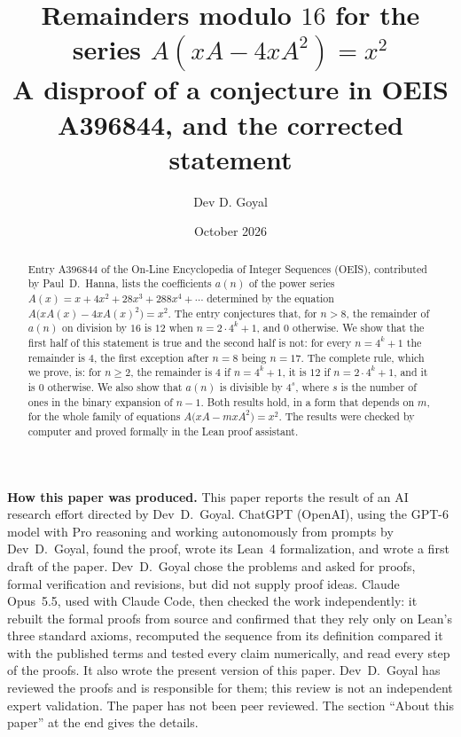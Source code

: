 \documentclass[11pt,a4paper]{article}
\title{Remainders modulo $16$ for the series $A(xA-4xA^2)=x^2$\\[6pt]\large A disproof of a conjecture in OEIS A396844, and the corrected statement}
\author{Dev D. Goyal}
\date{October 2026}
\theoremstyle{definition}
\theoremstyle{remark}
\begin{document}
\maketitle
\begin{abstract}
Entry A396844 of the On-Line Encyclopedia of Integer Sequences (OEIS), contributed by Paul~D.~Hanna, lists the
coefficients $a(n)$ of the power series $A(x)=x+4x^2+28x^3+288x^4+\cdots$ determined by the equation
$A\bigl(xA(x)-4xA(x)^2\bigr)=x^2$. The entry conjectures that, for $n>8$, the remainder of $a(n)$ on division by $16$ is
$12$ when $n=2\cdot4^k+1$, and $0$ otherwise. We show that the first half of this statement is true and the second
half is not: for every $n=4^k+1$ the remainder is $4$, the first exception after $n=8$ being $n=17$. The complete rule,
which we prove, is: for $n\ge2$, the remainder is $4$ if $n=4^k+1$, it is $12$ if $n=2\cdot4^k+1$, and it is $0$
otherwise. We also show that $a(n)$ is divisible by $4^s$, where $s$ is the number of ones in the binary expansion of
$n-1$. Both results hold, in a form that depends on $m$, for the whole family of equations $A\bigl(xA-mxA^2\bigr)=x^2$.
The results were checked by computer and proved formally in the Lean proof assistant.
\end{abstract}
\begin{center}\begin{minipage}{0.88\linewidth}\small
\textbf{How this paper was produced.} This paper reports the result of an AI research effort directed by
Dev~D.~Goyal. ChatGPT (OpenAI), using the GPT-6 model with Pro reasoning and working autonomously from prompts by
Dev~D.~Goyal, found the proof, wrote its Lean~4 formalization, and wrote a first draft of the paper.
Dev~D.~Goyal chose the problems and asked for proofs, formal verification and revisions, but did not supply proof
ideas. Claude Opus~5.5, used with Claude Code, then checked the work independently: it rebuilt the formal proofs from
source and confirmed that they rely only on Lean's three standard axioms, recomputed the sequence from its definition
compared it with the published terms and tested every claim numerically, and read every step of the proofs. It also wrote the present
version of this paper.
Dev~D.~Goyal has reviewed the proofs and is responsible for them; this review is not an independent expert validation.
The paper has not been peer reviewed.
The section ``About this paper'' at the end gives the details.
\end{minipage}\end{center}
\end{document}
